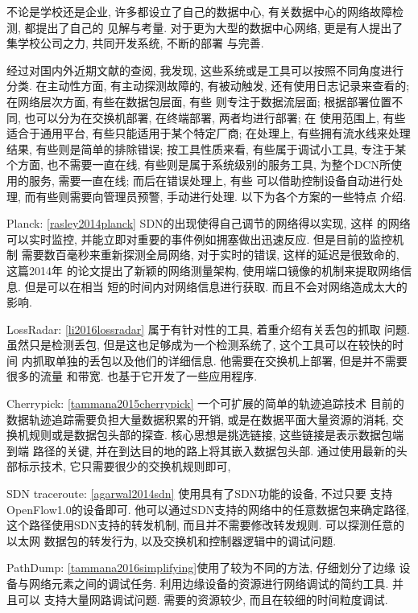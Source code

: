 {\begin{mdframed}[everyline=true]
不论是学校还是企业, 许多都设立了自己的数据中心,
有关数据中心的网络故障检测, 都提出了自己的 见解与考量.
对于更为大型的数据中心网络, 更是有人提出了集学校公司之力, 共同开发系统,
不断的部署 与完善.

经过对国内外近期文献的查阅, 我发现,
这些系统或是工具可以按照不同角度进行分类. 在主动性方面,
有主动探测故障的, 有被动触发, 还有使用日志记录来查看的; 在网络层次方面,
有些在数据包层面, 有些 则专注于数据流层面; 根据部署位置不同,
也可以分为在交换机部署, 在终端部署, 两者均进行部署; 在 使用范围上,
有些适合于通用平台, 有些只能适用于某个特定厂商; 在处理上,
有些拥有流水线来处理结果, 有些则是简单的排除错误; 按工具性质来看,
有些属于调试小工具, 专注于某个方面, 也不需要一直在线,
有些则是属于系统级别的服务工具, 为整个DCN所使用的服务, 需要一直在线;
而后在错误处理上, 有些 可以借助控制设备自动进行处理,
而有些则需要向管理员预警, 手动进行处理. 以下为各个方案的一些特点 介绍.

Planck: \ref{rasley2014planck} SDN的出现使得自己调节的网络得以实现, 这样
的网络可以实时监控, 并能立即对重要的事件例如拥塞做出迅速反应.
但是目前的监控机制 需要数百毫秒来重新探测全局网络, 对于实时的错误,
这样的延迟是很致命的, 这篇2014年 的论文提出了新颖的网络测量架构,
使用端口镜像的机制来提取网络信息. 但是可以在相当
短的时间内对网络信息进行获取. 而且不会对网络造成太大的影响.

LossRadar: \ref{li2016lossradar} 属于有针对性的工具,
着重介绍有关丢包的抓取 问题. 虽然只是检测丢包,
但是这也足够成为一个检测系统了, 这个工具可以在较快的时间
内抓取单独的丢包以及他们的详细信息. 他需要在交换机上部署,
但是并不需要很多的流量 和带宽. 也基于它开发了一些应用程序.

Cherrypick: \ref{tammana2015cherrypick} 一个可扩展的简单的轨迹追踪技术
目前的数据轨迹追踪需要负担大量数据积累的开销,
或是在数据平面大量资源的消耗, 交换机规则或是数据包头部的探查.
核心思想是挑选链接, 这些链接是表示数据包端到端 路径的关键,
并在到达目的地的路上将其嵌入数据包头部. 通过使用最新的头部标示技术,
它只需要很少的交换机规则即可,

SDN traceroute: \ref{agarwal2014sdn} 使用具有了SDN功能的设备, 不过只要
支持OpenFlow1.0的设备即可.
他可以通过SDN支持的网络中的任意数据包来确定路径,
这个路径使用SDN支持的转发机制, 而且并不需要修改转发规则.
可以探测任意的以太网 数据包的转发行为,
以及交换机和控制器逻辑中的调试问题.

PathDump: \ref{tammana2016simplifying}使用了较为不同的方法,
仔细划分了边缘 设备与网络元素之间的调试任务.
利用边缘设备的资源进行网络调试的简约工具. 并且可以 支持大量网路调试问题.
需要的资源较少, 而且在较细的时间粒度调试.


\end{mdframed}}
